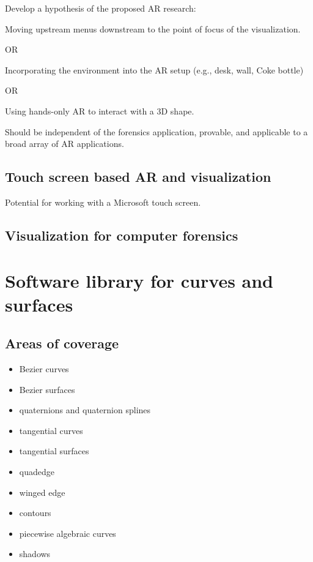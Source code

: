 \documentclass[11pt]{article}
\begin{document}
Develop a hypothesis of the proposed AR research:

Moving upstream menus downstream to the point of focus of the visualization.

OR

Incorporating the environment into the AR setup (e.g., desk, wall, Coke bottle)

OR

Using hands-only AR to interact with a 3D shape.

Should be independent of the forensics application, provable, and applicable to
a broad array of AR applications.

\subsection{Touch screen based AR and visualization}

Potential for working with a Microsoft touch screen.

\subsection{Visualization for computer forensics}


\section{Software library for curves and surfaces}


\subsection{Areas of coverage}

\begin{itemize}
\item Bezier curves
\item Bezier surfaces
\item quaternions and quaternion splines
\item tangential curves
\item tangential surfaces
\item quadedge
\item winged edge
\item contours
\item piecewise algebraic curves
\item shadows
\end{itemize}
\end{document}

